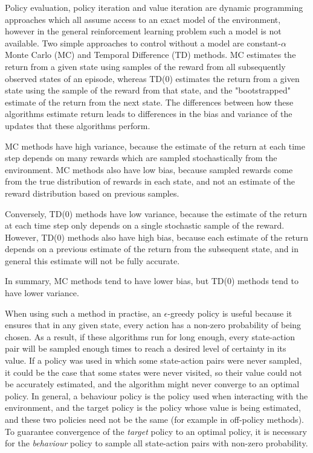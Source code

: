 Policy evaluation, policy iteration and value iteration are dynamic programming approaches which all assume access to an exact model of the environment, however in the general reinforcement learning problem such a model is not available. Two simple approaches to control without a model are constant-$\alpha$ Monte Carlo (MC) and Temporal Difference (TD) methods. MC estimates the return from a given state using samples of the reward from all subsequently observed states of an episode, whereas TD(0) estimates the return from a given state using the sample of the reward from that state, and the "bootstrapped" estimate of the return from the next state. The differences between how these algorithms estimate return leads to differences in the bias and variance of the updates that these algorithms perform.

MC methods have high variance, because the estimate of the return at each time step depends on many rewards which are sampled stochastically from the environment. MC methods also have low bias, because sampled rewards come from the true distribution of rewards in each state, and not an estimate of the reward distribution based on previous samples.

Conversely, TD(0) methods have low variance, because the estimate of the return at each time step only depends on a single stochastic sample of the reward. However, TD(0) methods also have high bias, because each estimate of the return depends on a previous estimate of the return from the subsequent state, and in general this estimate will not be fully accurate.

In summary, MC methods tend to have lower bias, but TD(0) methods tend to have lower variance.

When using such a method in practise, an $\epsilon$-greedy policy is useful because it ensures that in any given state, every action has a non-zero probability of being chosen. As a result, if these algorithms run for long enough, every state-action pair will be sampled enough times to reach a desired level of certainty in its value. If a policy was used in which some state-action pairs were never sampled, it could be the case that some states were never visited, so their value could not be accurately estimated, and the algorithm might never converge to an optimal policy. In general, a behaviour policy is the policy used when interacting with the environment, and the target policy is the policy whose value is being estimated, and these two policies need not be the same (for example in off-policy methods). To guarantee convergence of the \emph{target} policy to an optimal policy, it is necessary for the \emph{behaviour} policy to sample all state-action pairs with non-zero probability.

